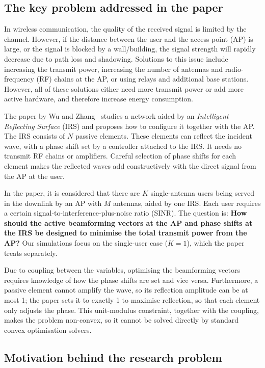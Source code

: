 \documentclass[11pt,a4paper]{article}
\begin{document}
\subsection{The key problem addressed in the paper}

In wireless communication, the quality of the received signal is limited by the channel. However, if
the distance between the user and the access point (AP) is large, or the signal is blocked by a
wall/building, the signal strength will rapidly decrease due to path loss and shadowing. Solutions to
this issue include increasing the transmit power, increasing the number of antennas and
radio-frequency (RF) chains at the AP, or using relays and additional base stations. However, all of
these solutions either need more transmit power or add more active hardware, and therefore increase
energy consumption.

The paper by Wu and Zhang~\cite{wu} studies a network aided by an \emph{Intelligent Reflecting Surface} (IRS) and
proposes how to configure it together with the AP. The IRS consists of $N$ passive elements. These
elements can reflect the incident wave, with a phase shift set by a controller attached to the IRS. It
needs no transmit RF chains or amplifiers. Careful selection of phase shifts for each element makes the
reflected waves add constructively with the direct signal from the AP at the user.

In the paper, it is considered that there are $K$ single-antenna users being served in the downlink
by an AP with $M$ antennas, aided by one IRS. Each user requires a certain signal-to-interference-plus-noise
ratio (SINR). The question is: \textbf{How should the active beamforming vectors at the AP and phase
shifts at the IRS be designed to minimise the total transmit power from the AP?} Our simulations focus
on the single-user case ($K=1$), which the paper treats separately.

Due to coupling between the variables, optimising the beamforming vectors requires knowledge of how the
phase shifts are set and vice versa. Furthermore, a passive element cannot amplify the wave, so its
reflection amplitude can be at most 1; the paper sets it to exactly 1 to maximise reflection, so that
each element only adjusts the phase. This unit-modulus constraint, together with the coupling, makes
the problem non-convex, so it cannot be solved directly by standard convex optimisation solvers.

\subsection{Motivation behind the research problem}
\end{document}
